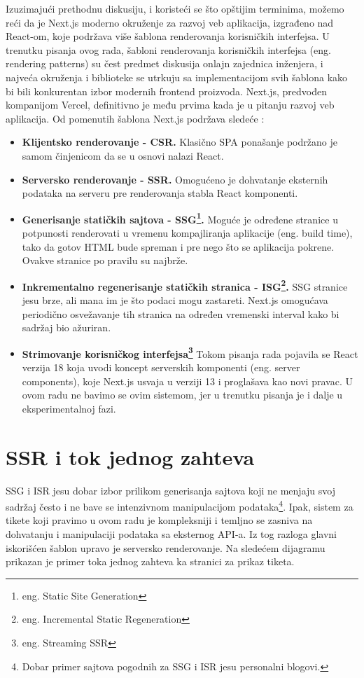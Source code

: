 \documentclass[12pt,oneside]{memoir}
\begin{document}
Izuzimajući prethodnu diskusiju, i koristeći se što opštijim terminima, možemo reći da je Next.js moderno okruženje za razvoj veb aplikacija, izgrađeno nad React-om, koje podržava više šablona renderovanja korisničkih interfejsa. U trenutku pisanja ovog rada, šabloni renderovanja korisničkih interfejsa (eng. rendering patterns) su čest predmet diskusija onlajn zajednica inženjera, i najveća okruženja i biblioteke se utrkuju sa implementacijom svih šablona kako bi bili konkurentan izbor modernih frontend proizvoda. Next.js, predvođen kompanijom Vercel, definitivno je među prvima kada je u pitanju razvoj veb aplikacija. Od pomenutih šablona Next.js podržava sledeće \cite{nextjsdocs}:
\begin{itemize}
    \item \textbf{Klijentsko renderovanje - CSR.} Klasično SPA ponašanje podržano je samom činjenicom da se u osnovi nalazi React.
    \item \textbf{Serversko renderovanje - SSR.} Omogućeno je dohvatanje eksternih podataka na serveru pre renderovanja stabla React komponenti.
    \item \textbf{Generisanje statičkih sajtova - SSG\footnote{eng. Static Site Generation}.} Moguće je određene stranice u potpunosti renderovati u vremenu kompajliranja aplikacije (eng. build time), tako da gotov HTML bude spreman i pre nego što se aplikacija pokrene. Ovakve stranice po pravilu su najbrže.
    \item \textbf{Inkrementalno regenerisanje statičkih stranica - ISG\footnote{eng. Incremental Static Regeneration}.} SSG stranice jesu brze, ali mana im je što podaci mogu zastareti. Next.js omogućava periodično osvežavanje tih stranica na određen vremenski interval kako bi sadržaj bio ažuriran.
    \item \textbf{Strimovanje korisničkog interfejsa\footnote{eng. Streaming SSR}} Tokom pisanja rada pojavila se React verzija 18 koja uvodi koncept serverskih komponenti (eng. server components), koje Next.js usvaja u verziji 13 i proglašava kao novi pravac. U ovom radu ne bavimo se ovim sistemom, jer u trenutku pisanja je i dalje u eksperimentalnoj fazi.
\end{itemize}

\section{SSR i tok jednog zahteva}

SSG i ISR jesu dobar izbor prilikom generisanja sajtova koji ne menjaju svoj sadržaj često i ne bave se intenzivnom manipulacijom podataka\footnote{Dobar primer sajtova pogodnih za SSG i ISR jesu personalni blogovi.}. Ipak, sistem za tikete koji pravimo u ovom radu je kompleksniji i temljno se zasniva na dohvatanju i manipulaciji podataka sa eksternog API-a. Iz tog razloga glavni iskorišćen šablon upravo je serversko renderovanje. Na sledećem dijagramu prikazan je primer toka jednog zahteva ka stranici za prikaz tiketa.
\end{document}
